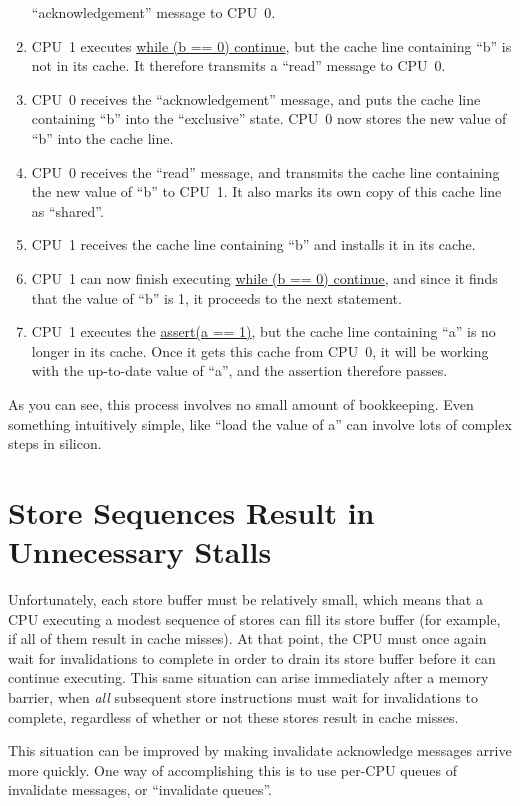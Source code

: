 \begin{enumerate}
	``acknowledgement'' message to CPU~0.
\item	CPU~1 executes \url{while (b == 0) continue}, but the cache line
	containing ``b'' is not in its cache.
	It therefore transmits a ``read'' message to CPU~0.
\item	CPU~0 receives the ``acknowledgement'' message, and puts
	the cache line containing ``b'' into the ``exclusive'' state.
	CPU~0 now stores the new value of ``b'' into the cache line.
\item	CPU~0 receives the ``read'' message, and transmits the
	cache line containing the new value of ``b''
	to CPU~1.
	It also marks its own copy of this cache line as ``shared''.
\item	CPU~1 receives the cache line containing ``b'' and installs
	it in its cache.
\item	CPU~1 can now finish executing \url{while (b == 0) continue},
	and since it finds that the value of ``b'' is 1, it proceeds
	to the next statement.
\item	CPU~1 executes the \url{assert(a == 1)}, but the cache line containing
	``a'' is no longer in its cache.
	Once it gets this cache from CPU~0, it will be
	working with the up-to-date value of ``a'', and the assertion
	therefore passes.
\end{enumerate}

As you can see, this process involves no small amount of bookkeeping.
Even something intuitively simple, like ``load the value of a'' can
involve lots of complex steps in silicon.

\section{Store Sequences Result in Unnecessary Stalls}
\label{sec:app:whymb:Store Sequences Result in Unnecessary Stalls}

Unfortunately, each store buffer must be relatively small, which means
that a CPU executing a modest sequence of stores can fill its store
buffer (for example, if all of them result in cache misses).
At that point, the CPU must once again wait for invalidations to complete
in order to drain its store buffer before it can continue executing.
This same situation can arise immediately after a memory barrier, when
\emph{all} subsequent store instructions must wait for invalidations to
complete, regardless of whether or not these stores result in cache misses.

This situation can be improved by making invalidate acknowledge
messages arrive more quickly.
One way of accomplishing this is to use per-CPU queues of
invalidate messages, or ``invalidate queues''.

